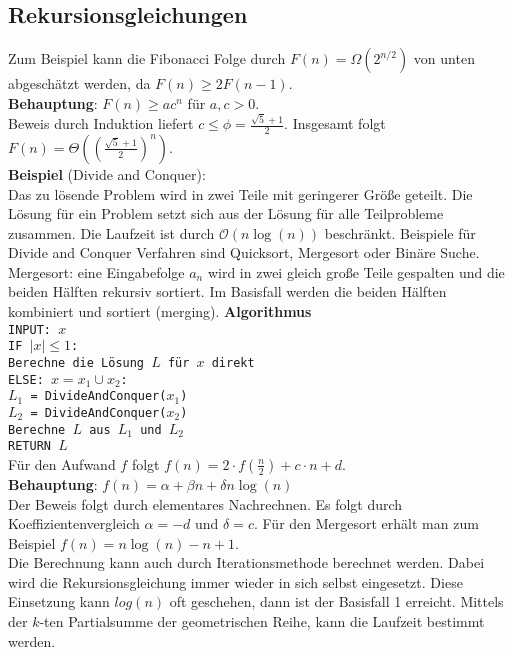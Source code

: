 \documentclass[a4paper, 12pt]{article}
\begin{document}
	\subsection{Rekursionsgleichungen}
	Zum Beispiel kann die Fibonacci Folge durch $F(n) = \Omega(2^{n/2})$ von unten abgeschätzt werden, da $F(n) \geq 2F(n-1)$.\\
	\textbf{Behauptung}: $F(n) \geq ac^n$ für $a,c >0$.\\ Beweis durch Induktion liefert $c \leq \phi = \frac{\sqrt{5}+1}{2}$. Insgesamt folgt $F(n) = \Theta((\frac{\sqrt{5}+1}{2})^n)$.\\
	\textbf{Beispiel} (Divide and Conquer):\\
	Das zu lösende Problem wird in zwei Teile mit geringerer Größe geteilt. Die Lösung für ein Problem setzt sich aus der Lösung für alle Teilprobleme zusammen. Die Laufzeit ist durch $\mathcal{O}(n\log(n))$ beschränkt. Beispiele für Divide and Conquer Verfahren sind Quicksort, Mergesort oder Binäre Suche.\\
	Mergesort: eine Eingabefolge $a_n$ wird in zwei gleich große Teile gespalten und die beiden Hälften rekursiv sortiert. Im Basisfall werden die beiden Hälften kombiniert und sortiert (merging).\newpage
	\textbf{Algorithmus}\\
	\texttt{INPUT: $x$\\
	IF $\left|x\right|\leq 1$:\\
	\indent Berechne die Lösung $L$ für $x$ direkt\\
	ELSE: $x = x_1 \cup x_2$:\\
	\indent $L_1$ = DivideAndConquer($x_1$)\\
	\indent $L_2$ = DivideAndConquer($x_2$)\\
	\indent Berechne $L$ aus $L_1$ und $L_2$\\
	RETURN $L$}\\
	Für den Aufwand $f$ folgt $f(n) = 2\cdot f(\frac{n}{2}) + c\cdot n + d$.	\\
	\textbf{Behauptung}: $f(n) = \alpha + \beta n +\delta n \log(n)$\\
	Der Beweis folgt durch elementares Nachrechnen. Es folgt durch Koeffizientenvergleich $\alpha = -d$ und $\delta = c$. Für den Mergesort erhält man zum Beispiel $f(n) = n\log(n) - n +1$.\\
	Die Berechnung kann auch durch Iterationsmethode berechnet werden. Dabei wird die Rekursionsgleichung immer wieder in sich selbst eingesetzt. Diese Einsetzung kann $log(n)$ oft geschehen, dann ist der Basisfall 1 erreicht. Mittels der $k$-ten Partialsumme der geometrischen Reihe, kann die Laufzeit bestimmt werden.\\
\end{document}
